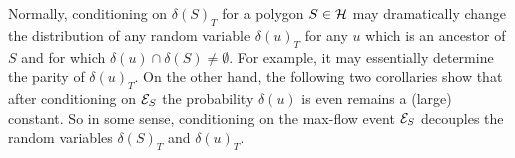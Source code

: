 


Normally, conditioning on $\delta(S)_T$ for a polygon $S \in \mathcal{H}$ may dramatically change the distribution of any random variable $\delta(u)_T$ for any $u$ which is an ancestor of $S$ and for which $\delta(u) \cap \delta(S) \not= \emptyset$. For example, it may essentially determine the parity of $\delta(u)_T$. 
On the other hand, the following two corollaries show that after conditioning on ${\cal E}_S$ the probability $\delta(u)$ is even remains a (large) constant. So in some sense, conditioning on the max-flow event ${\cal E}_S$ decouples the random variables $\delta(S)_T$ and $\delta(u)_T$.

